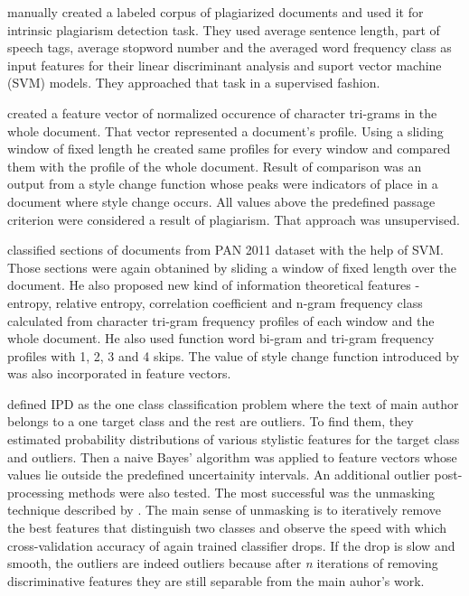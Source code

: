 \documentclass[10pt, a4paper]{article}
\begin{document}
\citet{zu-2006} manually created a labeled corpus of plagiarized documents and used it for intrinsic plagiarism detection task. They used average sentence length, part of speech tags, average stopword number and the averaged word frequency class as input features for their linear discriminant analysis and suport vector machine (SVM) models. They approached that task in a supervised fashion. 

\citet{stamatatos-2009b} created a feature vector of normalized occurence of character tri-grams in the whole document. That vector represented a document's profile. Using a sliding window of fixed length he created same profiles for every window and compared them with the profile of the whole document. Result of comparison was an output from a style change function whose peaks were indicators of place in a document where style change occurs. All values above the predefined passage criterion were considered a result of plagiarism. That approach was unsupervised.

\citet{rahman-2015} classified sections of documents from PAN 2011 dataset with the help of SVM. Those sections were again obtanined by sliding a window of fixed length over the document. He also proposed new kind of information theoretical features - entropy, relative entropy, correlation coefficient and n-gram frequency class calculated from character tri-gram frequency profiles of each window and the whole document. He also used function word bi-gram and tri-gram frequency profiles with 1, 2, 3 and 4 skips. The value of style change function introduced by \citet{stamatatos-2009b} was also incorporated in feature vectors.

\citet{stein-2011} defined IPD as the one class classification problem where the text of main author belongs to a one target class and the rest are outliers. To find them, they estimated probability distributions of various stylistic features for the target class and outliers. Then a naive Bayes' algorithm was applied to feature vectors whose values lie outside the predefined uncertainity intervals. An additional outlier post-processing methods were also tested. The most successful was the unmasking technique described by \citet{koppel-2009}. The main sense of unmasking is to iteratively remove the best features that distinguish two classes and observe the speed with which cross-validation accuracy of again trained classifier drops. If the drop is slow and smooth, the outliers are indeed outliers because after \textit{n} iterations of removing discriminative features they are still separable from the main auhor's work.
\end{document}
